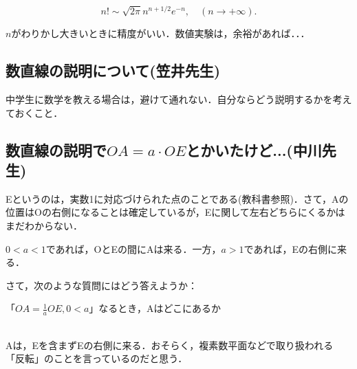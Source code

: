 \documentclass[dvipdfmx,11pt]{jsarticle}
\begin{document}
\begin{theorem}
    \[ n! \sim  \sqrt{2\pi} n^{n+1/2} e^{-n}, \quad (n \to +\infty).\]
\end{theorem}
$n$がわりかし大きいときに精度がいい．数値実験は，余裕があれば．．．

\subsection{数直線の説明について(笠井先生)}
中学生に数学を教える場合は，避けて通れない．自分ならどう説明するかを考えておくこと．

\subsection{数直線の説明で$OA=a \cdot OE$とかいたけど...(中川先生)}
Eというのは，実数1に対応づけられた点のことである(教科書参照)．さて，Aの位置はOの右側になることは確定しているが，Eに関して左右どちらにくるかはまだわからない．

$0 < a < 1$であれば，OとEの間にAは来る．一方，$a>1$であれば，Eの右側に来る．

さて，次のような質問にはどう答えようか：\\
\centerline{「$OA=\frac{1}{a}OE, 0 < a$」なるとき，Aはどこにあるか} \\
Aは，Eを含まずEの右側に来る．おそらく，複素数平面などで取り扱われる「反転」のことを言っているのだと思う．
\end{document}
